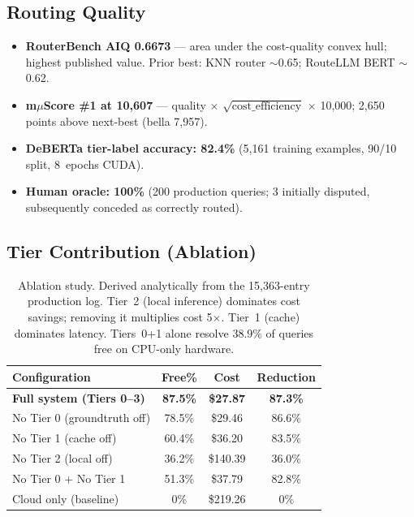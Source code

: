 \documentclass[11pt]{article}
\begin{document}
\subsection{Routing Quality}

\begin{itemize}
  \item \textbf{RouterBench AIQ 0.6673} --- area under the
    cost-quality convex hull; highest published value. Prior best:
    KNN router $\sim$0.65; RouteLLM BERT $\sim$0.62.
  \item \textbf{m$\mu$Score \#1 at 10,607} --- quality $\times$
    $\sqrt{\text{cost\_efficiency}}$ $\times$ 10,000; 2,650 points
    above next-best (bella 7,957).
  \item \textbf{DeBERTa tier-label accuracy: 82.4\%} (5,161
    training examples, 90/10 split, 8~epochs CUDA).
  \item \textbf{Human oracle: 100\%} (200 production queries; 3
    initially disputed, subsequently conceded as correctly routed).
\end{itemize}

\subsection{Tier Contribution (Ablation)}

\begin{table}[t]
\centering
\small
\begin{tabular}{lccc}
\toprule
\textbf{Configuration} & \textbf{Free\%} & \textbf{Cost} & \textbf{Reduction} \\
\midrule
\textbf{Full system (Tiers 0--3)} & \textbf{87.5\%} & \textbf{\$27.87} & \textbf{87.3\%} \\
No Tier 0 (groundtruth off) & 78.5\% & \$29.46 & 86.6\% \\
No Tier 1 (cache off) & 60.4\% & \$36.20 & 83.5\% \\
No Tier 2 (local off) & 36.2\% & \$140.39 & 36.0\% \\
No Tier 0 + No Tier 1 & 51.3\% & \$37.79 & 82.8\% \\
Cloud only (baseline) & 0\% & \$219.26 & 0\% \\
\bottomrule
\end{tabular}
\caption{Ablation study. Derived analytically from the 15,363-entry
production log. Tier~2 (local inference) dominates cost savings;
removing it multiplies cost 5$\times$. Tier~1 (cache) dominates
latency. Tiers~0+1 alone resolve 38.9\% of queries free on CPU-only
hardware.}
\label{tab:ablation}
\end{table}
\end{document}
